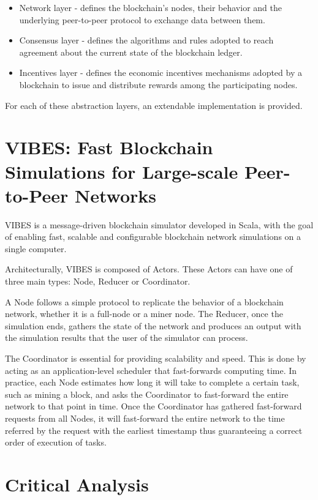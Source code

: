 \begin{itemize}
	\item Network layer - defines the blockchain’s nodes, their behavior and the underlying peer-to-peer protocol to exchange data between them.
	\item Consensus layer - defines the algorithms and rules adopted to reach agreement about the current state of the blockchain ledger.
	\item Incentives layer - defines the economic incentives mechanisms adopted by a blockchain to issue and distribute rewards among the participating nodes.
\end{itemize}

For each of these abstraction layers, an extendable implementation is provided.


\section{VIBES: Fast Blockchain Simulations for Large-scale Peer-to-Peer Networks}
\label{sec:vibes}

VIBES \cite{vibes} is a message-driven blockchain simulator developed in Scala, with the goal of enabling fast, scalable and configurable blockchain network simulations on a single computer.

Architecturally, VIBES is composed of Actors. These Actors can have one of three main types: Node, Reducer or Coordinator.

A Node follows a simple protocol to replicate the behavior of a blockchain network, whether it is a full-node or a miner node. The Reducer, once the simulation ends, gathers the state of the network and produces an output with the simulation results that the user of the simulator can process.

The Coordinator is essential for providing scalability and speed. This is done by acting as an application-level scheduler that fast-forwards computing time. In practice, each Node estimates how long it will take to complete a certain task, such as mining a block, and asks the Coordinator to fast-forward the entire network to that point in time. Once the Coordinator has gathered fast-forward requests from all Nodes, it will fast-forward the entire network to the time referred by the request with the earliest timestamp thus guaranteeing a correct order of execution of tasks.


\section{Critical Analysis}
\label{sec:critical_analysis}

